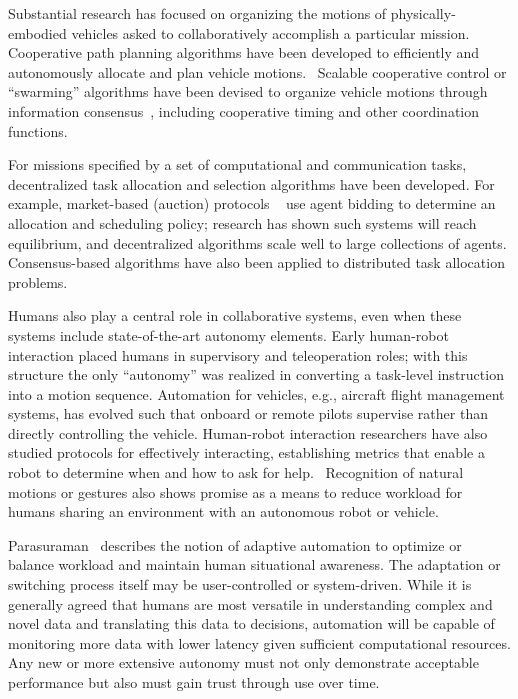 Substantial research has focused on organizing the motions of physically-embodied vehicles
asked to collaboratively accomplish a particular mission.  Cooperative path planning algorithms have been 
developed to efficiently and autonomously allocate and plan vehicle motions.~\cite{tsourdos2010cooperative,
bellingham2003multi}  Scalable cooperative control or ``swarming'' algorithms 
have been devised to organize vehicle motions through information consensus~\cite{ren2007information}, 
including cooperative timing and other coordination functions.~\cite{mclain2005coordination}

For missions specified by a set of computational and communication tasks,
decentralized task allocation and selection algorithms have been developed.  For example, market-based 
(auction) protocols ~\cite{wellman2001auction, walsh2003decentralized}
use agent bidding to determine an allocation and scheduling policy; research has shown such
systems will reach equilibrium, and decentralized algorithms scale well to large collections of agents.
Consensus-based algorithms have also been applied to distributed task allocation problems.~\cite{choi2009consensus}

Humans also play a central role in collaborative systems, 
even when these systems include state-of-the-art autonomy elements.
Early human-robot interaction placed humans in supervisory and teleoperation roles; with this structure
the only ``autonomy'' was realized in converting a task-level instruction into a motion sequence.  Automation
for vehicles, e.g., aircraft flight management systems, has evolved such that onboard or remote pilots 
supervise rather than directly controlling the vehicle.  Human-robot interaction researchers have also studied
protocols for effectively interacting, establishing metrics that enable a robot to determine when and how to
ask for help.~\cite{fong2003collaboration} Recognition of natural motions or gestures 
also shows promise as a means to reduce workload for humans sharing an environment with an autonomous robot or vehicle.
~\cite{nehaniv2005methodological}

Parasuraman~\cite{parasuraman2008humans} describes the notion of adaptive automation
to optimize or balance workload and maintain human situational awareness.  The adaptation or switching process
itself may be user-controlled or system-driven.  While it is generally agreed that humans are most versatile 
in understanding complex and novel data and translating this data to decisions, automation will be capable 
of monitoring more data with lower latency given sufficient computational resources.  Any new or more extensive
autonomy must not only demonstrate acceptable performance but also must gain trust through use over time.

